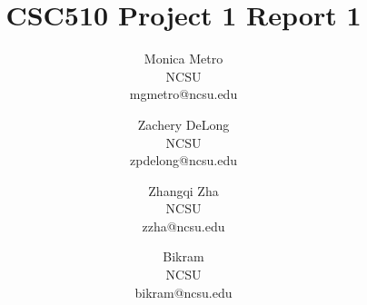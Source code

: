 \documentclass{sig-alternate-05-2015}
\begin{document}
\title{CSC510 Project 1 Report 1}

\author{
	{\large Monica Metro}\\NCSU\\mgmetro@ncsu.edu 
	\and {\large Zachery DeLong}\\NCSU\\zpdelong@ncsu.edu 
	\and {\large Zhangqi Zha}\\NCSU\\zzha@ncsu.edu
	\and {\large Bikram }\\NCSU\\bikram@ncsu.edu }

\maketitle



















\end{document}
